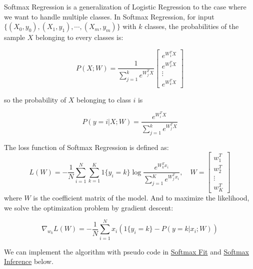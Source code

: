 \documentclass{article}
\begin{document}
Softmax Regression is a generalization of Logistic Regression to the case where we want to handle multiple classes. In Softmax Regression, for input $\{(X_0, y_0), (X_1, y_1), \cdots, (X_m, y_m)\}$ with $k$ classes, the probabilities of the sample $X$ belonging to every classes is:

\[
    P(X; W) = \frac{1}{\sum_{j=1}^{k} e^{W_j^T X}} \begin{bmatrix}
        e^{W_1^T X} \\
        e^{W_2^T X} \\
        \vdots \\
        e^{W_k^T X}
    \end{bmatrix}
\]

so the probability of $X$ belonging to class $i$ is

$$
P(y = i | X; W) = \frac{e^{W_i^T X}}{\sum_{j=1}^{k} e^{W_j^T X}}
$$

The loss function of Softmax Regression is defined as:
\[
    L(W) = -\frac{1}{N} \sum_{i=1}^{N} \sum_{k=1}^{K} 1\{y_i = k\} \log \frac{e^{W_k^T x_i}}{\sum_{j=1}^{K} e^{W_j^T x_i}},\quad 
    W = \begin{bmatrix}
        w_1^T \\
        w_2^T \\
        \vdots \\
        w_K^T
    \end{bmatrix}
\]
where $W$ is the coefficient matrix of the model. And to maximize the likelihood, we solve the optimization problem by gradient descent:

\[
    \nabla_{w_k} L(W) = -\frac{1}{N} \sum_{i=1}^{N} x_i (1\{y_i = k\} - P(y = k | x_i; W))
\]

We can implement the algorithm with pseudo code in \href{alg:softmax-fit}{Softmax Fit} and \href{alg:softmax-infer}{Softmax Inference} below.
\end{document}
